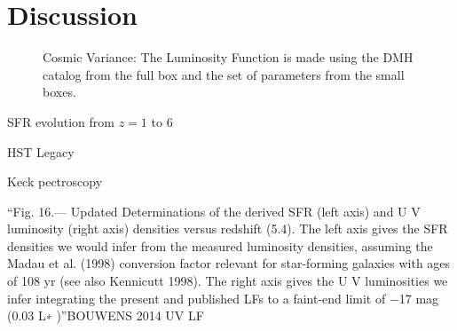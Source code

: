 \section{Discussion}

\begin{figure}
\caption{Cosmic Variance: The Luminosity Function is made using the DMH catalog 
from the full box and the set of parameters from the small boxes.}
\label{graph_cosmic_variance}
\end{figure}

\citep{lundgren14} SFR evolution from $z=1$ to $6$

\citep{bouwens14} HST Legacy

\citep{jiang11} Keck pectroscopy


``Fig. 16.— Updated Determinations of the derived SFR (left axis) and U V
luminosity (right axis) densities versus redshift (5.4). The
left axis gives the SFR densities we would infer from the measured luminosity
densities, assuming the Madau et al. (1998) conversion
factor relevant for star-forming galaxies with ages of 108 yr (see also
Kennicutt 1998). The right axis gives the U V luminosities we infer
integrating the present and published LFs to a faint-end limit of −17 mag (0.03
L∗ )''BOUWENS 2014 UV LF


